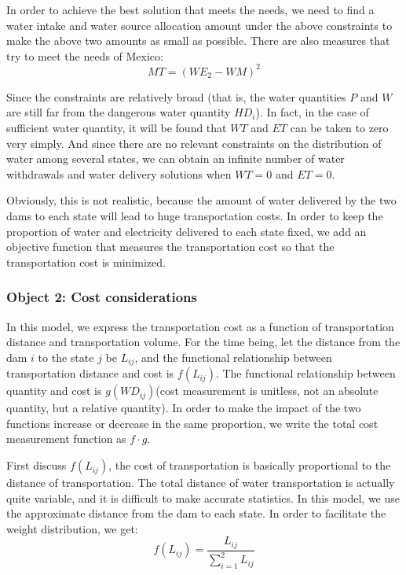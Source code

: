\documentclass{mcmthesis}
\begin{document}
In order to achieve the best solution that meets the needs, we need to find a water intake and water source allocation amount under the above constraints to make the above two amounts as small as possible. There are also measures that try to meet the needs of Mexico:
\begin{equation}
	MT=(WE_2-WM)^2
\end{equation}

Since the constraints are relatively broad (that is, the water quantities $P$ and $W$ are still far from the dangerous water quantity $HD_i$). In fact, in the case of sufficient water quantity, it will be found that $WT$ and $ET$ can be taken to zero very simply. And since there are no relevant constraints on the distribution of water among several states, we can obtain an infinite number of water withdrawals and water delivery solutions when $WT=0$ and $ET=0$.

Obviously, this is not realistic, because the amount of water delivered by the two dams to each state will lead to huge transportation costs. In order to keep the proportion of water and electricity delivered to each state fixed, we add an objective function that measures the transportation cost so that the transportation cost is minimized.

\subsubsection{Object 2: Cost considerations}
In this model, we express the transportation cost as a function of transportation distance and transportation volume. For the time being, let the distance from the dam $i$ to the state $j$ be $L_{ij}$, and the functional relationship between transportation distance and cost is $f(L_{ij})$. The functional relationship between quantity and cost is $g(WD_{ij})$(cost measurement is unitless, not an absolute quantity, but a relative quantity). In order to make the impact of the two functions increase or decrease in the same proportion, we write the total cost measurement function as $f\cdot g$.

First discuss $f(L_{ij})$, the cost of transportation is basically proportional to the distance of transportation. The total distance of water transportation is actually quite variable, and it is difficult to make accurate statistics. In this model, we use the approximate distance from the dam to each state. In order to facilitate the weight distribution, we get:
\begin{equation}
	f(L_{ij})=\frac{L_{ij}}{\sum_{i=1}^{2}L_{ij}}
\end{equation}
\end{document}
